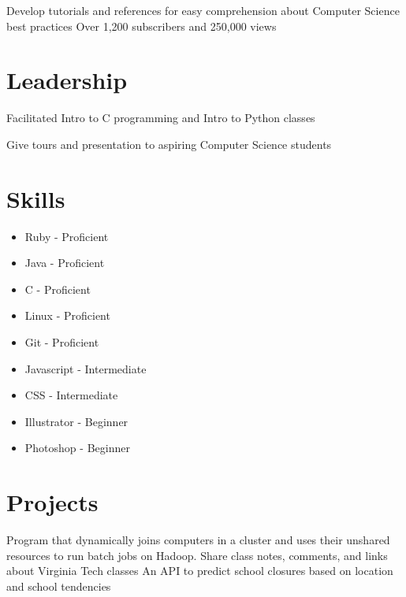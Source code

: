 \documentclass{my_cv}
\begin{document}
\workitemstwo
{Develop tutorials and references for easy comprehension about Computer Science best practices }
{Over 1,200 subscribers and 250,000 views}

\section{Leadership}



\workitemsone
 {Facilitated Intro to C programming and Intro to Python classes}

\workitemsone
 {Give tours and presentation to aspiring Computer Science students}

\section{Skills}
\begin{multicols}{3}
\begin{itemize}
    \item Ruby - Proficient
    \item Java - Proficient
    \item C - Proficient
    \item Linux - Proficient
    \item Git - Proficient
    \item Javascript - Intermediate
    \item CSS - Intermediate
    \item Illustrator - Beginner
    \item Photoshop - Beginner
    
\end{itemize}
\end{multicols}

\section{Projects}
\workitemsone
 { Program that dynamically joins computers in a cluster and uses their unshared resources to run batch jobs on Hadoop.}
\workitemsone
 { Share class notes, comments, and links about  Virginia Tech classes }
\workitemsone
 { An API to predict school closures based on location and school tendencies }
\end{document}
